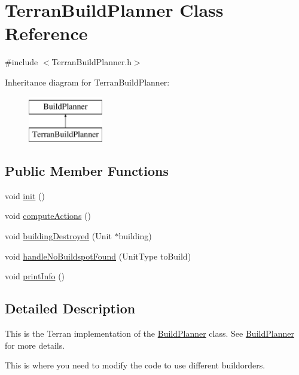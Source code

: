 \hypertarget{class_terran_build_planner}{
\section{TerranBuildPlanner Class Reference}
\label{class_terran_build_planner}
}


{\ttfamily \#include $<$TerranBuildPlanner.h$>$}

Inheritance diagram for TerranBuildPlanner:\begin{figure}[H]
\begin{center}
\leavevmode
\includegraphics[height=2.000000cm]{class_terran_build_planner}
\end{center}
\end{figure}
\subsection*{Public Member Functions}
\begin{DoxyCompactItemize}
\item 
void \hyperlink{class_terran_build_planner_a181de9c603191265e5e83e44930e0f29}{init} ()
\item 
void \hyperlink{class_terran_build_planner_aa4450d4f89770cb4d9ae07545fc135fe}{computeActions} ()
\item 
void \hyperlink{class_terran_build_planner_a48b1a8d16ba56e95d94003caf067d400}{buildingDestroyed} (Unit $\ast$building)
\item 
void \hyperlink{class_terran_build_planner_a22d9e41dc8fa671860bff12ef17ac4cd}{handleNoBuildspotFound} (UnitType toBuild)
\item 
void \hyperlink{class_terran_build_planner_a0f5f8da8b80c575414fa89777f6bcfd0}{printInfo} ()
\end{DoxyCompactItemize}


\subsection{Detailed Description}
This is the Terran implementation of the \hyperlink{class_build_planner}{BuildPlanner} class. See \hyperlink{class_build_planner}{BuildPlanner} for more details.

This is where you need to modify the code to use different buildorders.

